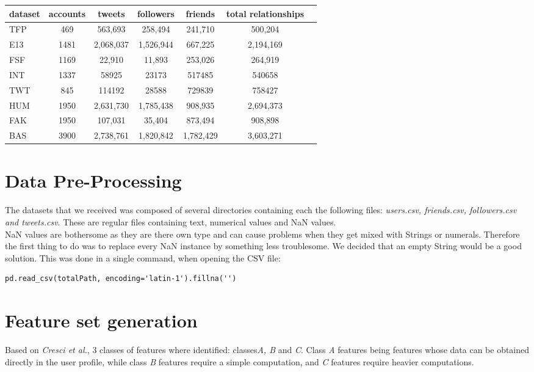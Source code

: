 \documentclass[a4paper,11pt]{article}
\begin{document}
\begin{tabular}{lcccccc}
dataset & accounts & tweets & followers & friends & total relationships \\
\hline
TFP & 469 & 563,693 & 258,494 & 241,710 & 500,204 \\
E13 & 1481 & 2,068,037 & 1,526,944 & 667,225 & 2,194,169 \\
FSF & 1169 & 22,910 & 11,893 & 253,026 & 264,919 \\
INT & 1337 & 58925 & 23173 & 517485 & 540658 \\
TWT & 845 & 114192 & 28588 & 729839 & 758427 \\
\hline
HUM & 1950 & 2,631,730 & 1,785,438 & 908,935 & 2,694,373 \\
FAK & 1950 & 107,031 & 35,404 & 873,494 & 908,898 \\
\hline
BAS & 3900 & 2,738,761 & 1,820,842 & 1,782,429 & 3,603,271 \\
\end{tabular}


\section{Data Pre-Processing}
\paragraph{}
The datasets that we received was composed of several directories containing each the following files: \textit{users.csv, friends.csv, followers.csv and tweets.csv}. These are regular files containing text, numerical values and NaN values.\\

NaN values are bothersome as they are there own type and can cause problems when they get mixed with Strings or numerals. Therefore the first thing to do was to replace every NaN instance by something less troublesome. We decided that an empty String would be a good solution. This was done in a single command, when opening the CSV file:

\begin{lstlisting}
pd.read_csv(totalPath, encoding='latin-1').fillna('')
\end{lstlisting}

\section{Feature set generation}
Based on \textit{Cresci et al.}, 3 classes of features where identified: classes\textit{A, B} and \textit{C}. Class \textit{A} features being features whose data can be obtained directly in the user profile, while class \textit{B} features require a simple computation, and \textit{C} features require heavier computations.\\
\end{document}
